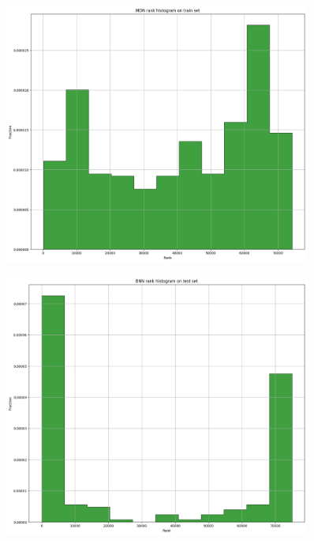 \documentclass[12pt,a4paper,twoside]{scrartcl}
\numberwithin{equation}{section}
\newcounter{mypagecount}%
\newenvironment{interlude}{%
  \clearpage
  \setcounter{mypagecount}{\value{page}}%
  \thispagestyle{empty}%
  \pagestyle{empty}%
}{%
  \clearpage
  \setcounter{page}{\value{mypagecount}}%
}
\begin{document}
\begin{interlude}
\begin{appendices}
\begin{center}
\begin{figure}[htpb]
        \caption[BNN one day rank histogram]{}\label{fig:bnn-rank-1d}
      \end{figure}
    \end{center}
    \begin{center}
      \begin{figure}[htpb]
        \centering
        \includegraphics[height=0.6\textwidth, width=0.9\textwidth]{figures/model_plots/mdn-rank-12h}
        \caption[BNN one day rank histogram]{}\label{fig:mdn-rank-12h}
      \end{figure}
    \end{center}
    \begin{center}
      \begin{figure}[htpb]
        \centering
        \includegraphics[height=0.6\textwidth, width=0.9\textwidth]{figures/model_plots/bnn-rank-12h}
        \caption[BNN one day rank histogram]{}\label{fig:bnn-rank-12h}
      \end{figure}
    \end{center}
    \begin{center}

\end{center}
\end{appendices}
\end{interlude}
\end{document}
